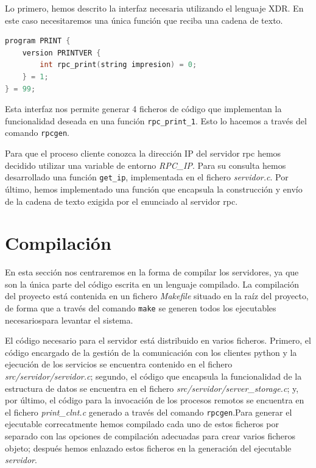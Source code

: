 \documentclass[]{article}
\begin{document}
Lo primero, hemos descrito la interfaz necesaria utilizando el lenguaje XDR. En este caso necesitaremos una única función que reciba una cadena de texto. 

\begin{lstlisting}[language=C, caption=Interfaz XDR]
program PRINT {
    version PRINTVER {
        int rpc_print(string impresion) = 0;
    } = 1;
} = 99;
\end{lstlisting}

Esta interfaz nos permite generar 4 ficheros de código que implementan la funcionalidad deseada en una función \texttt{rpc\_print\_1}. Esto lo hacemos a través del comando \texttt{rpcgen}.

Para que el proceso cliente conozca la dirección IP del servidor rpc hemos decidido utilizar una variable de entorno \textit{RPC\_IP}. Para su consulta hemos desarrollado una función \texttt{get\_ip}, implementada en el fichero \textit{servidor.c}. Por último, hemos implementado una función que encapsula la construcción y envío de la cadena de texto exigida por el enunciado al servidor rpc. 

\section{Compilación}
\label{sec:compilacion}
En esta sección nos centraremos en la forma de compilar los servidores, ya que son la única parte del código escrita en un lenguaje compilado. La compilación del proyecto está contenida en un fichero \textit{Makefile} situado en la raíz del proyecto, de forma que a través del comando \texttt{make} se generen todos los ejecutables necesariospara levantar el sistema.  

El código necesario para el servidor está distribuido en varios ficheros. Primero, el código encargado de la gestión de la comunicación con los clientes python y la ejecución de los servicios se encuentra contenido en el fichero \textit{src/servidor/servidor.c}; segundo, el código que encapsula la funcionalidad de la estructura de datos se encuentra en el fichero \textit{src/servidor/server\_storage.c}; y, por último, el código para la invocación de los procesos remotos se encuentra en el fichero \textit{print\_clnt.c} generado a través del comando \texttt{rpcgen}.Para generar el ejecutable correcatmente hemos compilado cada uno de estos ficheros por separado con las opciones de compilación adecuadas para crear varios ficheros objeto; después hemos enlazado estos ficheros en la generación del ejecutable \textit{servidor}.
\end{document}
